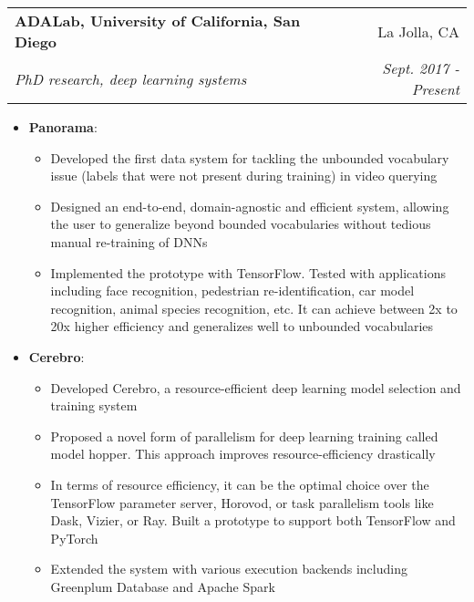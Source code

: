 \documentclass[letterpaper,11pt]{article}
\makeatletter
\newcommand{\resumeItem}[2]{
  \item\small{
    \textbf{#1}{: #2 \vspace{-2pt}}
  }
}
\newcommand{\resumeSubheading}[4]{
  \vspace{-1pt}\item
    \begin{tabular*}{0.97\textwidth}[t]{l@{\extracolsep{\fill}}r}
      \textbf{#1} & #2 \\
      \textit{\small#3} & \textit{\small #4}
    \end{tabular*}\vspace{-5pt}
}
\newcommand{\resumeItemListStart}{\begin{itemize}}
\newcommand{\resumeItemListEnd}{\end{itemize}\vspace{-5pt}}
\makeatother
\begin{document}
    \resumeSubheading
      {ADALab, University of California, San Diego}{La Jolla, CA}
      {PhD research, deep learning systems}{Sept. 2017 - Present}
     
      \resumeItemListStart
        \resumeItem{Panorama}
          {}
          {\small
           \begin{itemize}
                 \item Developed the first data system for tackling the unbounded vocabulary issue (labels that were not present during training) in video querying \vspace{-2pt}
              	 \item Designed an end-to-end, domain-agnostic and efficient system, allowing the user to generalize beyond bounded vocabularies without tedious manual re-training of DNNs \vspace{-2pt}
	          \item Implemented the prototype with TensorFlow. Tested with applications including face recognition, pedestrian re-identification, car model recognition, animal species recognition, etc. It can achieve between 2x to 20x higher efficiency and generalizes well to unbounded vocabularies \vspace{-2pt}
            \end{itemize}
          }
          \resumeItem{Cerebro}
          {}
          {\small 
          \begin{itemize}
                 \item Developed Cerebro, a resource-efficient deep learning model selection and training system \vspace{-2pt}
              	 \item Proposed a novel form of parallelism for deep learning training called model hopper. This approach improves resource-efficiency drastically\vspace{-2pt}
	          \item In terms of resource efficiency, it can be the optimal choice over the TensorFlow parameter server, Horovod, or task parallelism tools like Dask, Vizier, or Ray. Built a prototype to support both TensorFlow and PyTorch \vspace{-2pt}
	          \item Extended the system with various execution backends including Greenplum Database and Apache Spark
            \end{itemize}\vspace{-5pt}
            }
      \resumeItemListEnd
\end{document}
